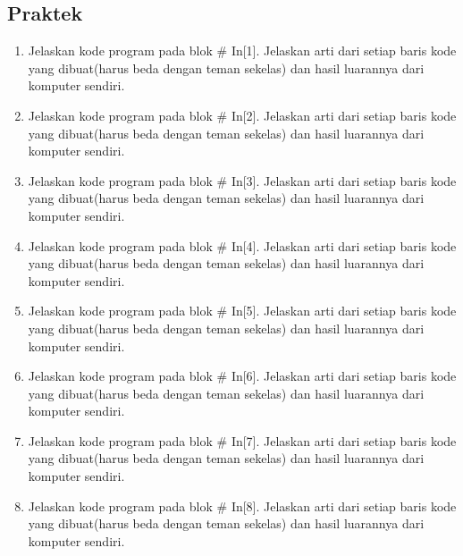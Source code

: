 \subsection{Praktek}
\begin{enumerate}
\item Jelaskan kode program pada blok \# In[1]. Jelaskan arti dari setiap baris kode yang dibuat(harus beda dengan teman sekelas) dan hasil luarannya dari komputer sendiri.


\item Jelaskan kode program pada blok \# In[2]. Jelaskan arti dari setiap baris kode yang dibuat(harus beda dengan teman sekelas) dan hasil luarannya dari komputer sendiri.


\item Jelaskan kode program pada blok \# In[3]. Jelaskan arti dari setiap baris kode yang dibuat(harus beda dengan teman sekelas) dan hasil luarannya dari komputer sendiri.


\item Jelaskan kode program pada blok \# In[4]. Jelaskan arti dari setiap baris kode yang dibuat(harus beda dengan teman sekelas) dan hasil luarannya dari komputer sendiri.


\item Jelaskan kode program pada blok \# In[5]. Jelaskan arti dari setiap baris kode yang dibuat(harus beda dengan teman sekelas) dan hasil luarannya dari komputer sendiri.


\item Jelaskan kode program pada blok \# In[6]. Jelaskan arti dari setiap baris kode yang dibuat(harus beda dengan teman sekelas) dan hasil luarannya dari komputer sendiri.


\item Jelaskan kode program pada blok \# In[7]. Jelaskan arti dari setiap baris kode yang dibuat(harus beda dengan teman sekelas) dan hasil luarannya dari komputer sendiri.


\item Jelaskan kode program pada blok \# In[8]. Jelaskan arti dari setiap baris kode yang dibuat(harus beda dengan teman sekelas) dan hasil luarannya dari komputer sendiri.



\end{enumerate}
